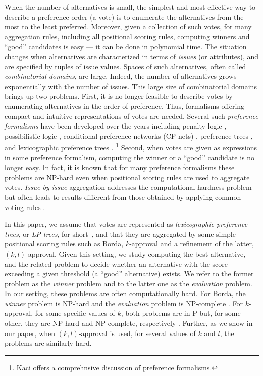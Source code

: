 When the number of alternatives is small, the simplest and most effective 
way to describe a preference order (a vote) is to enumerate the
alternatives from the most to the least preferred. Moreover, given a 
collection of such votes, for many aggregation rules, including all 
positional scoring rules, computing winners and ``good'' candidates is 
easy --- it can be done in polynomial time. The situation changes when
alternatives are characterized in terms of \emph{issues} (or attributes),
and are specified by tuples of issue values. Spaces of such alternatives,
often called \emph{combinatorial domains}, are large. Indeed, the number 
of alternatives grows exponentially with the number of issues. This
large size of combinatorial domains brings up two problems. First, it is
no longer feasible to describe votes by enumerating alternatives in the
order of preference. Thus, formalisms offering compact and intuitive
representations of votes are needed. Several such \emph{preference
formalisms} have been developed over the years including penalty logic 
\cite{de1994penalty}, possibilistic logic \cite{DuboisLP91}, conditional
preference networks (CP nets) \cite{bbdh03}, preference
trees \cite{what}, and lexicographic preference trees \cite{what}.%
\footnote{Kaci \cite{Kaci:Pref} offers a comprehnsive discussion of 
preference formalisms.} Second, when votes are given as expressions in 
some preference formalism, computing the winner or a ``good'' candidate 
is no longer easy. In fact, it is known that for many preference formalisms 
these problems are NP-hard even when positional scoring rules are used 
to aggregate votes. \emph{Issue-by-issue} aggregation addresses the
computational hardness problem but often leads to results different from 
those obtained by applying common voting rules \cite{fargier:ibi}.
  
In this paper, we assume that votes are represented as \emph{lexicographic
preference trees}, or \emph{LP trees}, for short~\cite{booth:learningLP},
and that they are aggregated by some simple positional scoring rules such 
as Borda, $k$-approval and a refinement of the latter, $(k,l)$-approval.
Given this setting, we study computing the best alternative, and the related 
problem to decide whether an alternative with the score exceeding a given 
threshold (a ``good'' alternative) exists. We refer to the former problem 
as the \emph{winner} problem and to the latter one as 
the \emph{evaluation} problem. In our setting, these problems are often
computationally hard. For Borda, the \emph{winner} problem is NP-hard and 
the \emph{evaluation} problem is NP-complete \cite{lang:aggLP}. For $k$-approval, 
for some specific values of $k$, both problems are in P but, for some other, 
they are NP-hard and NP-complete, respectively \cite{lang:aggLP}. Further,
as we show in our paper, when $(k,l)$-approval is used, for several values 
of $k$ and $l$, the problems are similarly hard.

